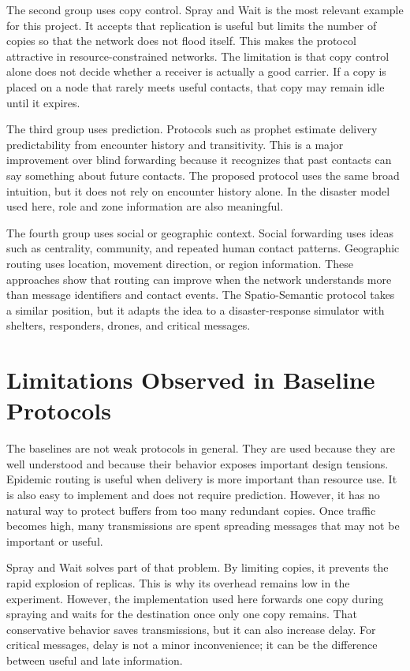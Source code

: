 The second group uses copy control. Spray and Wait is the most relevant example for this project. It accepts that replication is useful but limits the number of copies so that the network does not flood itself. This makes the protocol attractive in resource-constrained networks. The limitation is that copy control alone does not decide whether a receiver is actually a good carrier. If a copy is placed on a node that rarely meets useful contacts, that copy may remain idle until it expires.

The third group uses prediction. Protocols such as \ac{prophet} estimate delivery predictability from encounter history and transitivity. This is a major improvement over blind forwarding because it recognizes that past contacts can say something about future contacts. The proposed protocol uses the same broad intuition, but it does not rely on encounter history alone. In the disaster model used here, role and zone information are also meaningful.

The fourth group uses social or geographic context. Social forwarding uses ideas such as centrality, community, and repeated human contact patterns. Geographic routing uses location, movement direction, or region information. These approaches show that routing can improve when the network understands more than message identifiers and contact events. The Spatio-Semantic protocol takes a similar position, but it adapts the idea to a disaster-response simulator with shelters, responders, drones, and critical messages.

\section{Limitations Observed in Baseline Protocols}
The baselines are not weak protocols in general. They are used because they are well understood and because their behavior exposes important design tensions. Epidemic routing is useful when delivery is more important than resource use. It is also easy to implement and does not require prediction. However, it has no natural way to protect buffers from too many redundant copies. Once traffic becomes high, many transmissions are spent spreading messages that may not be important or useful.

Spray and Wait solves part of that problem. By limiting copies, it prevents the rapid explosion of replicas. This is why its overhead remains low in the experiment. However, the implementation used here forwards one copy during spraying and waits for the destination once only one copy remains. That conservative behavior saves transmissions, but it can also increase delay. For critical messages, delay is not a minor inconvenience; it can be the difference between useful and late information.

